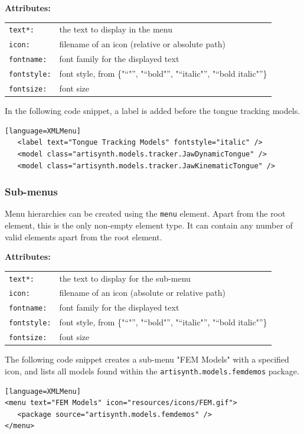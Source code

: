 \documentclass{article}
\newcommand{\openquot}{\iflatexml"\else``\fi}
\newcommand{\closequot}{\iflatexml"\else''\fi}
\newcommand{\quot}[1]{\openquot#1\closequot}
\begin{document}
\noindent \textbf{Attributes:}\\
\begin{tabular}{ll}
   {\tt text*:} & the text to display in the menu\\
   {\tt icon:} & filename of an icon (relative or absolute path)\\
   {\tt fontname:} & font family for the displayed text\\
   {\tt fontstyle:} & font style, from \{\quot{}, \quot{bold}, \quot{italic},
      \quot{bold italic}\}\\
   {\tt fontsize:} & font size
\end{tabular}
\medskip

In the following code snippet, a label is added before the tongue tracking 
models.
\begin{lstlisting}[][language=XMLMenu]
   <label text="Tongue Tracking Models" fontstyle="italic" />
   <model class="artisynth.models.tracker.JawDynamicTongue" />
   <model class="artisynth.models.tracker.JawKinematicTongue" />
\end{lstlisting}

\subsubsection{Sub-menus}

Menu hierarchies can be created using the {\tt menu} element.  Apart from the
root element, this is the only non-empty element type.  It can contain any
number of valid elements apart from the root element.

\noindent \textbf{Attributes:}\\
\begin{tabular}{ll}
   {\tt text*:} & the text to display for the sub-menu\\
   {\tt icon:} & filename of an icon (absolute or relative path)\\
   {\tt fontname:} & font family for the displayed text\\
   {\tt fontstyle:} & font style, from \{\quot{}, \quot{bold}, \quot{italic},
      \quot{bold italic}\}\\
   {\tt fontsize:} & font size
\end{tabular}
\medskip

The following code snippet creates a sub-menu "FEM Models" with a specified
icon, and lists all models found within the {\tt artisynth.models.femdemos} 
package.
\begin{lstlisting}[][language=XMLMenu]
<menu text="FEM Models" icon="resources/icons/FEM.gif">
   <package source="artisynth.models.femdemos" />
</menu>
\end{lstlisting}
\end{document}
